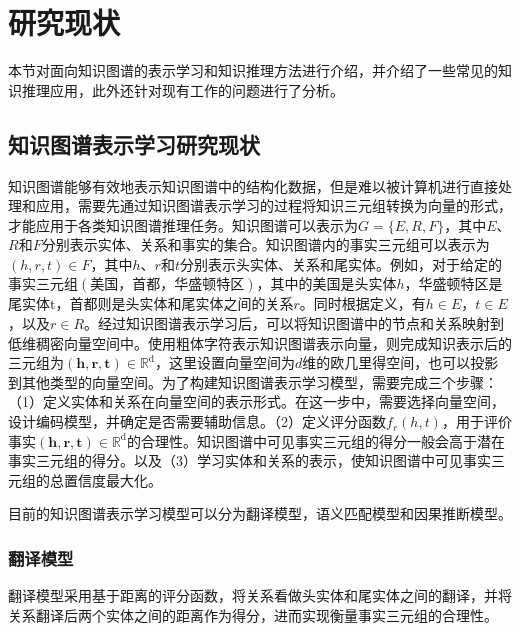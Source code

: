 \documentclass[algorithmlist, AutoFakeBold, AutoFakeSlant, figurelist, tablelist, nomlist, masters]{seuthesix}
\begin{document}
\section{研究现状}
本节对面向知识图谱的表示学习和知识推理方法进行介绍，并介绍了一些常见的知识推理应用，此外还针对现有工作的问题进行了分析。

\subsection{知识图谱表示学习研究现状}
知识图谱能够有效地表示知识图谱中的结构化数据，但是难以被计算机进行直接处理和应用，需要先通过知识图谱表示学习的过程将知识三元组转换为向量的形式，才能应用于各类知识图谱推理任务。知识图谱可以表示为$G=\{E, R, F\}$，其中$E$、$R$和$F$分别表示实体、关系和事实的集合。知识图谱内的事实三元组可以表示为$(h, r, t) \in F$，其中$h$、$r$和$t$分别表示头实体、关系和尾实体。例如，对于给定的事实三元组$\left(\mbox{美国，首都，华盛顿特区}\right)$，其中的$\mbox{美国}$是头实体$h$，$\mbox{华盛顿特区}$是尾实体t，$\mbox{首都}$则是头实体和尾实体之间的关系$r$。同时根据定义，有$h \in E$，$t \in E$，以及$r \in R$。经过知识图谱表示学习后，可以将知识图谱中的节点和关系映射到低维稠密向量空间中。使用粗体字符表示知识图谱表示向量，则完成知识表示后的三元组为$\left(\bm{h}, \bm{r}, \bm{t}\right) \in \mathbb{R}^{\mathrm{d}}$，这里设置向量空间为$d$维的欧几里得空间，也可以投影到其他类型的向量空间。为了构建知识图谱表示学习模型，需要完成三个步骤：（1）定义实体和关系在向量空间的表示形式。在这一步中，需要选择向量空间，设计编码模型，并确定是否需要辅助信息。（2）定义评分函数$f_r(h, t)$，用于评价事实$\left(\bm{h}, \bm{r}, \bm{t}\right) \in \mathbb{R}^{\mathrm{d}}$的合理性。知识图谱中可见事实三元组的得分一般会高于潜在事实三元组的得分。以及（3）学习实体和关系的表示，使知识图谱中可见事实三元组的总置信度最大化。

目前的知识图谱表示学习模型可以分为翻译模型，语义匹配模型和因果推断模型。

\subsubsection{翻译模型}
翻译模型采用基于距离的评分函数，将关系看做头实体和尾实体之间的翻译，并将关系翻译后两个实体之间的距离作为得分，进而实现衡量事实三元组的合理性。
\end{document}
